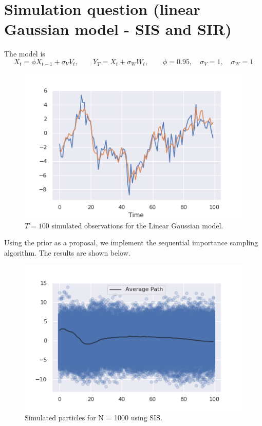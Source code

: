 \documentclass[12pt,letterpaper]{article}
\begin{document}
\newpage
\section*{Simulation question (linear Gaussian model - SIS and SIR)}

The model is
$$
X_t = \phi X_{t-1} + \sigma_V V_t,
\quad \quad
Y_T = X_t + \sigma_W W_t,
\quad \quad
\phi = 0.95,\quad \sigma_V = 1, \quad \sigma_W = 1
$$
    \begin{figure}[H]
        \centering
        \includegraphics[width=12cm]{images/LinearGaussian.png}
        \caption{$T = 100$ simulated observations for the Linear Gaussian
        model.}
    \end{figure}

Using the prior as a proposal, we implement the sequential
importance sampling algorithm.
The results are shown below.

    \begin{figure}[H]
        \centering
        \includegraphics[width=12cm]{images/SIS_Paths.png}
        \caption{Simulated particles for N = 1000 using SIS.}
    \end{figure}
\end{document}
